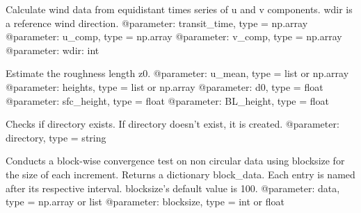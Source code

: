 \documentclass[letterpaper,10pt,english]{sphinxmanual}
\begin{document}

\begin{fulllineitems}
\label{\detokenize{index:windtunnel.calc_wind_stats_wght}}
Calculate wind data from equidistant times series of u and 
v components. wdir is a reference wind direction.
@parameter: transit\_time, type = np.array
@parameter: u\_comp, type = np.array
@parameter: v\_comp, type = np.array
@parameter: wdir: int

\end{fulllineitems}


\begin{fulllineitems}
\label{\detokenize{index:windtunnel.calc_z0}}
Estimate the roughness length z0.
@parameter: u\_mean, type = list or np.array
@parameter: heights, type = list or np.array
@parameter: d0, type = float
@parameter: sfc\_height, type = float
@parameter: BL\_height, type = float

\end{fulllineitems}


\begin{fulllineitems}
\label{\detokenize{index:windtunnel.check_directory}}
Checks if directory exists. If directory doesn’t exist, it is created.
@parameter: directory, type = string

\end{fulllineitems}


\begin{fulllineitems}
\label{\detokenize{index:windtunnel.convergence_test_1}}
Conducts a block-wise convergence test on non circular data using 
blocksize for the size of each increment. Returns a dictionary block\_data.
Each entry is named after its respective interval. blocksize’s default 
value is 100.
@parameter: data, type = np.array or list
@parameter: blocksize, type = int or float

\end{fulllineitems}
\end{document}
